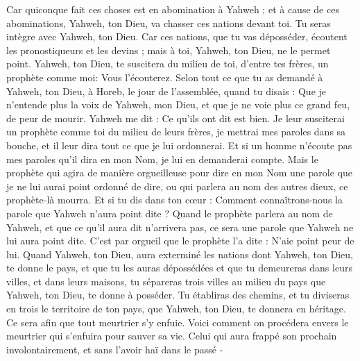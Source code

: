\begin{multicols}{2}
Car quiconque fait ces choses est en abomination à Yahweh ; et à cause de ces abominations, Yahweh, ton Dieu, va chasser ces nations devant toi.
Tu seras intègre avec Yahweh, ton Dieu.
Car ces nations, que tu vas déposséder, écoutent les pronostiqueurs et les devins ; mais à toi, Yahweh, ton Dieu, ne le permet point.
Yahweh, ton Dieu, te suscitera du milieu de toi, d'entre tes frères, un prophète comme moi: Vous l'écouterez.
Selon tout ce que tu as demandé à Yahweh, ton Dieu, à Horeb, le jour de l'assemblée, quand tu disais : Que je n'entende plus la voix de Yahweh, mon Dieu, et que je ne voie plus ce grand feu, de peur de mourir.
Yahweh me dit : Ce qu’ils ont dit est bien.
Je leur susciterai un prophète comme toi du milieu de leurs frères, je mettrai mes paroles dans sa bouche, et il leur dira tout ce que je lui ordonnerai.
Et si un homme n'écoute pas mes paroles qu’il dira en mon Nom, je lui en demanderai compte.
Mais le prophète qui agira de manière orgueilleuse pour dire en mon Nom une parole que je ne lui aurai point ordonné de dire, ou qui parlera au nom des autres dieux, ce prophète-là mourra.
Et si tu dis dans ton cœur : Comment connaîtrons-nous la parole que Yahweh n'aura point dite ?
Quand le prophète parlera au nom de Yahweh, et que ce qu’il aura dit n’arrivera pas, ce sera une parole que Yahweh ne lui aura point dite. C’est par orgueil que le prophète l'a dite : N’aie point peur de lui.
\VerseOne{}Quand Yahweh, ton Dieu, aura exterminé les nations dont Yahweh, ton Dieu, te donne le pays, et que tu les auras dépossédées et que tu demeureras dans leurs villes, et dans leurs maisons,
tu sépareras trois villes au milieu du pays que Yahweh, ton Dieu, te donne à posséder.
Tu établiras des chemins, et tu diviseras en trois le territoire de ton pays, que Yahweh, ton Dieu, te donnera en héritage. Ce sera afin que tout meurtrier s'y enfuie.
Voici comment on procédera envers le meurtrier qui s’enfuira pour sauver sa vie. Celui qui aura frappé son prochain involontairement, et sans l'avoir haï dans le passé -

\end{multicols}
